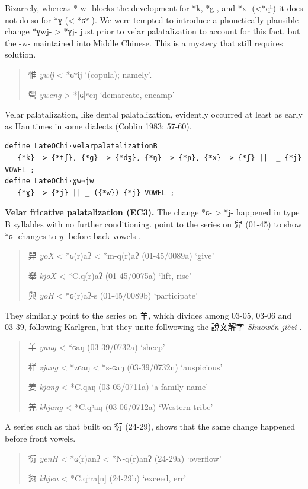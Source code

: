 \documentclass[xetex, svgnames, 12pt]{scrartcl}
\newcounter{para}
\newcommand\mypara[1]{\par\refstepcounter{para}\textbf{\thepara\space#1\space}}
\begin{document}
Bizarrely, whereas *-w- blocks the development for *k, *g-, and *x- (<*qʰ) it does not do so for *ɣ (< *ɢʷ-). We were tempted to introduce a phonetically plausible change *ɣwj- > *ɣj- just prior to velar palatalization to account for this fact, but the -w- maintained into Middle Chinese. This is a mystery that still requires solution.

\begin{quote}

惟 %
\textit{ywij} < *ɢʷij
‘(copula); namely’.

營 %
\textit{yweng} > *[ɢ]ʷeŋ
‘demarcate, encamp’
\end{quote}

Velar palatalization, like dental palatalization, evidently occurred at least as early as Han times in some dialects (Coblin 1983: 57-60).

\begin{verbatim}
define LateOChi·velarpalatalizationB 
   {*k} -> {*tʃ}, {*g} -> {*dʒ}, {*ŋ} -> {*ɲ}, {*x} -> {*ʃ} ||  _ {*j} VOWEL ; 
define LateOChi·ɣw⇒jw
   {*ɣ} -> {*j} || _ ({*w}) {*j} VOWEL ; 
\end{verbatim} 

\mypara{Velar fricative palatalization (EC3).}
\label{par:ɢ⇒jB}
The change *ɢ- > *j-  happened in type B syllables with no further conditioning. \citeauthor[]{Baxter2014OldChinese} point to the series on 舁 (01-45) to show *ɢ- changes to \textit{y}- before back vowels \citeyear[77]{Baxter2014OldChinese}.

\begin{quote}
舁 \textit{yoX} < *ɢ(r)aʔ < *m-q(r)aʔ (01-45/0089a) `give' 

舉 \textit{kjoX} < *C.q(r)aʔ (01-45/0075a) `lift, rise'

與 \textit{yoH} < *ɢ(r)aʔ-s (01-45/0089b) `participate'
\end{quote}
They similarly point to the series on 羊, which \citeauthor[PAGE]{Schuessler2009minimal} divides among 03-05, 03-06 and 03-39, following Karlgren,  but they unite follwowing the 說文解字 \textit{Shuōwén jiězì} \citep[77,106, 141]{Baxter2014OldChinese}.

\begin{quote}
    羊 \textit{yang} < *ɢaŋ (03-39/0732a) `sheep'
   
    祥 \textit{zjang} < *zɢaŋ < *s-ɢaŋ (03-39/0732n) `auspicious'
    
    姜 \textit{kjang} < *C.qaŋ (03-05/0711a) `a family name'
    
    羌 \textit{khjang} < *C.qʰaŋ (03-06/0712a) `Western tribe'
\end{quote}
A series such as that built on 衍 (24-29), shows that the same change happened before front vowels.
\begin{quote}
衍 \textit{yenH} < *ɢ(r)anʔ < *N-q(r)anʔ
(24-29a) `overflow'

愆 \textit{khjen} < *C.qʰra[n] (24-29b) `exceed, err'

\end{quote}
\end{document}
